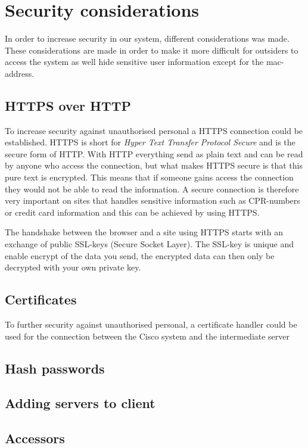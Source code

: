 \section{Security considerations}
In order to increase security in our system, different considerations was made. These considerations are made in order to make it more difficult for outsiders to access the system as well hide sensitive user information except for the mac-address.

\subsection*{HTTPS over HTTP} 
To increase security against unauthorised personal a HTTPS connection could be established. HTTPS is short for \textit{Hyper Text Transfer Protocol Secure} and is the secure form of HTTP. With HTTP everything send as plain text and can be read by anyone who access the connection, but what makes HTTPS secure is that this pure text is encrypted. This means that if someone gains access the connection they would not be able to read the information. A secure connection is therefore very important on sites that handles sensitive information such as CPR-numbers or credit card information and this can be achieved by using HTTPS\cite{HTTPS}.

The handshake between the browser and a site using HTTPS starts with an exchange of public SSL-keys (Secure Socket Layer). The SSL-key is unique and enable encrypt of the data you send, the encrypted data can then only be decrypted with your own private key\cite{HTTPS}.

\subsection*{Certificates}
To further security against unauthorised personal, a certificate handler could be used for the connection between the Cisco system and the intermediate server  

\subsection*{Hash passwords}
\subsection*{Adding servers to client}
\subsection*{Accessors}
